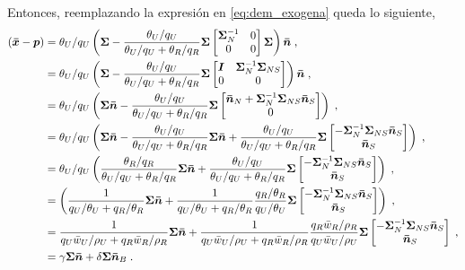 \documentclass{article}
\begin{document}
Entonces, reemplazando la expresión en \eqref{eq:dem_exogena} queda lo siguiente,
\begin{equation}
	\begin{split}
		(\bm{\Bar{x}}-\bm{p})&=\theta_{U}/q_{U}\left(\bm{\Sigma} - \frac{\theta_U/q_U}{\theta_U/q_U + \theta_R/q_R}\bm{\Sigma}\begin{bmatrix}
			\bm{\Sigma}^{-1}_{N} & 0\\
			0 & 0
		\end{bmatrix}
		\bm{\Sigma}
		\right)\bm{\Bar{n}}\;,\\
		&=\theta_{U}/q_{U}\left(\bm{\Sigma} - \frac{\theta_U/q_U}{\theta_U/q_U + \theta_R/q_R}\bm{\Sigma}\begin{bmatrix}
			\bm{I} & \bm{\Sigma}^{-1}_{N}\bm{\Sigma}_{NS}\\
			0 & 0
		\end{bmatrix}
		\right)\bm{\Bar{n}}\;,\\
		&= \theta_{U}/q_{U}\left(\bm{\Sigma}\bm{\Bar{n}} - \frac{\theta_U/q_U}{\theta_U/q_U + \theta_R/q_R}\bm{\Sigma}\begin{bmatrix}
			\bm{\Bar{n}}_{N}+\bm{\Sigma}^{-1}_{N}\bm{\Sigma}_{NS}\bm{\Bar{n}}_{S}\\
			0 
		\end{bmatrix}
		\right)\;,\\
		&= \theta_{U}/q_{U}\left(\bm{\Sigma}\bm{\Bar{n}} -\frac{\theta_U/q_U}{\theta_U/q_U + \theta_R/q_R}\bm{\Sigma}\bm{\Bar{n}}+ \frac{\theta_U/q_U}{\theta_U/q_U + \theta_R/q_R}\bm{\Sigma}\begin{bmatrix}
			-\bm{\Sigma}^{-1}_{N}\bm{\Sigma}_{NS}\bm{\Bar{n}}_{S}\\
			\bm{\Bar{n}}_{S} 
		\end{bmatrix}
		\right)\;,\\
		&= \theta_{U}/q_{U}\left(\frac{\theta_R/q_R}{\theta_U/q_U + \theta_R/q_R}\bm{\Sigma}\bm{\Bar{n}}+ \frac{\theta_U/q_U}{\theta_U/q_U + \theta_R/q_R}\bm{\Sigma}\begin{bmatrix}
			-\bm{\Sigma}^{-1}_{N}\bm{\Sigma}_{NS}\bm{\Bar{n}}_{S}\\
			\bm{\Bar{n}}_{S} 
		\end{bmatrix}
		\right)\;,\\
		&= \left(\frac{1}{q_U/\theta_U + q_R/\theta_R}\bm{\Sigma}\bm{\Bar{n}}+ \frac{1}{q_U/\theta_U + q_R/\theta_R}\frac{q_{R}/\theta_R}{q_U/\theta_U}\bm{\Sigma}\begin{bmatrix}
			-\bm{\Sigma}^{-1}_{N}\bm{\Sigma}_{NS}\bm{\Bar{n}}_{S}\\
			\bm{\Bar{n}}_{S} 
		\end{bmatrix}
		\right)\;,\\
		&= \frac{1}{q_U\Bar{w}_U/\rho_U + q_R\Bar{w}_R/\rho_R}\bm{\Sigma}\bm{\Bar{n}}+ \frac{1}{q_U\Bar{w}_U/\rho_U + q_R\Bar{w}_R/\rho_R}\frac{q_{R}\Bar{w}_R/\rho_R}{q_U\Bar{w}_U/\rho_U}\bm{\Sigma}\begin{bmatrix}
			-\bm{\Sigma}^{-1}_{N}\bm{\Sigma}_{NS}\bm{\Bar{n}}_{S}\\
			\bm{\Bar{n}}_{S} 
		\end{bmatrix}
		\;,\\
		&=\gamma\bm{\Sigma}\bm{\Bar{n}} + \delta\bm{\Sigma}\bm{\Bar{n}}_B\;.
	\end{split}
	\label{eq:id-boicott}
\end{equation}
\end{document}

